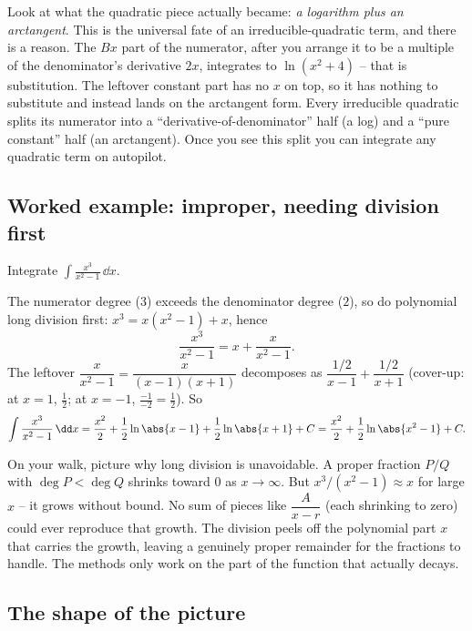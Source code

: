 \begin{happeningbox}
Look at what the quadratic piece actually became: \emph{a logarithm plus an
arctangent}. This is the universal fate of an irreducible-quadratic term, and
there is a reason. The $Bx$ part of the numerator, after you arrange it to be
a multiple of the denominator's derivative $2x$, integrates to $\ln(x^2+4)$ --
that is substitution. The leftover constant part has no $x$ on top, so it has
nothing to substitute and instead lands on the arctangent form. Every
irreducible quadratic splits its numerator into a ``derivative-of-denominator''
half (a log) and a ``pure constant'' half (an arctangent). Once you see this
split you can integrate any quadratic term on autopilot.
\end{happeningbox}

\subsection{Worked example: improper, needing division first}

\begin{example}
\label{ch24:ex-improper}
Integrate $\displaystyle \int \frac{x^3}{x^2 - 1}\,\dd x.$
\end{example}

The numerator degree ($3$) exceeds the denominator degree ($2$), so do
polynomial long division first: $x^3 = x(x^2-1) + x$, hence
\[
\frac{x^3}{x^2-1} = x + \frac{x}{x^2-1}.
\]
The leftover $\dfrac{x}{x^2-1} = \dfrac{x}{(x-1)(x+1)}$ decomposes as
$\dfrac{1/2}{x-1} + \dfrac{1/2}{x+1}$ (cover-up: at $x=1$, $\tfrac{1}{2}$; at
$x=-1$, $\tfrac{-1}{-2} = \tfrac{1}{2}$). So
\[
\int \frac{x^3}{x^2-1}\,\dd x
= \frac{x^2}{2} + \frac{1}{2}\ln\abs{x-1} + \frac{1}{2}\ln\abs{x+1} + C
= \frac{x^2}{2} + \frac{1}{2}\ln\abs{x^2-1} + C.
\]

\begin{walkbox}
On your walk, picture why long division is unavoidable. A proper fraction
$P/Q$ with $\deg P < \deg Q$ shrinks toward $0$ as $x\to\infty$. But $x^3/(x^2-1)
\approx x$ for large $x$ -- it grows without bound. No sum of pieces like
$\dfrac{A}{x-r}$ (each shrinking to zero) could ever reproduce that growth. The
division peels off the polynomial part $x$ that carries the growth, leaving a
genuinely proper remainder for the fractions to handle. The methods only work
on the part of the function that actually decays.
\end{walkbox}

\subsection{The shape of the picture}

